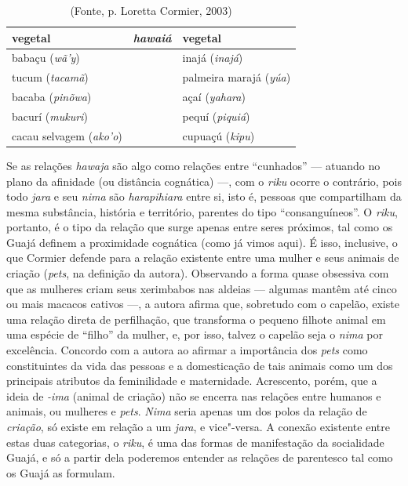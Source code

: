\begin{table}[H]
\centering
\caption{(Fonte, p. Loretta Cormier, 2003)}
\label{my-label}
\begin{tabular}{|l|l|l|}
\hline
\textbf{vegetal}       & \textit{\textbf{hawaiá}} & \textbf{vegetal}      \\ \hline
babaçu (\emph{wã'y})          &                         & inajá (\emph{inajá})         \\ \hline
tucum (\emph{tacamã})         &                         & palmeira marajá (\emph{yúa}) \\ \hline
bacaba (\emph{pinõwa})        &                         & açaí (\emph{yahara})         \\ \hline
bacurí (\emph{mukuri})        &                         & pequí (\emph{piquiá})        \\ \hline
cacau selvagem (\emph{ako'o}) &                         & cupuaçú (\emph{kipu})        \\ \hline
\end{tabular}
\end{table}

Se as relações \emph{hawaja} são algo como relações entre ``cunhados'' ---
atuando no plano da afinidade (ou distância cognática) ---, com o
\emph{riku} ocorre o contrário, pois todo \emph{jara} e seu \emph{nima}
são \emph{harapihiara} entre si, isto é, pessoas que compartilham da
mesma substância, história e território, parentes do tipo
``consanguíneos''. O \emph{riku}, portanto, é o tipo da relação que surge
apenas entre seres próximos, tal como os Guajá definem a proximidade
cognática (como já vimos aqui). É isso, inclusive, o que Cormier defende
para a relação existente entre uma mulher e seus animais de criação
(\emph{pets}, na definição da autora). Observando a forma quase
obsessiva com que as mulheres criam seus xerimbabos nas aldeias ---
algumas mantêm até cinco ou mais macacos cativos ---, a autora afirma que,
sobretudo com o capelão, existe uma relação direta de perfilhação, que
transforma o pequeno filhote animal em uma espécie de ``filho'' da mulher,
e, por isso, talvez o capelão seja o \emph{nima} por excelência.
Concordo com a autora ao afirmar a importância dos \emph{pets} como
constituintes da vida das pessoas e a domesticação de tais animais como
um dos principais atributos da feminilidade e maternidade. Acrescento,
porém, que a ideia de \emph{-ima} (animal de criação) não se encerra nas
relações entre humanos e animais, ou mulheres e \emph{pets}. \emph{Nima}
seria apenas um dos polos da relação de \emph{criação}, só existe em
relação a um \emph{jara}, e vice"-versa. A conexão existente entre estas
duas categorias, o \emph{riku}, é uma das formas de manifestação da
socialidade Guajá, e só a partir dela poderemos entender as relações de
parentesco tal como os Guajá as formulam.

